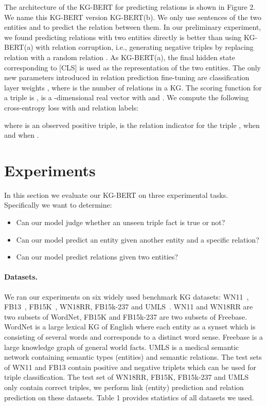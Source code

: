 \documentclass[letterpaper]{article} \usepackage{aaai20}  \usepackage{times}  \usepackage{helvet} \usepackage{courier}  \usepackage[hyphens]{url}  \usepackage{graphicx} \urlstyle{rm} \def\UrlFont{\rm}  \usepackage{graphicx}  \usepackage{amsmath}
\begin{document}
The architecture of the KG-BERT for predicting relations is shown in Figure 2. We name this KG-BERT version KG-BERT(b). We only use sentences of the two entities  and  to predict the relation  between them. In our preliminary experiment, we found predicting relations with two entities directly is better than using KG-BERT(a) with relation corruption, i.e., generating negative triples by replacing relation  with a random relation . As KG-BERT(a), the final hidden state  corresponding to [CLS] is used as the representation of the two entities. The only new parameters introduced in relation prediction fine-tuning are classification layer weights , where  is the number of relations in a KG. The scoring function for a triple  is ,  is a -dimensional real vector with  and . We compute the following cross-entropy loss with  and relation labels:

where  is an observed positive triple,  is the relation indicator for the triple ,  when  and  when .
\section{Experiments}

In this section we evaluate our KG-BERT on three experimental tasks. Specifically we want to determine:
\begin{itemize}
    \item Can our model judge whether an unseen triple fact  is true or not?
    \item Can our model predict an entity given another entity and a specific relation?
    \item Can our model predict relations given two entities?
\end{itemize}


\paragraph{Datasets.}
We ran our experiments on six widely used benchmark KG datasets: WN11~\cite{socher2013reasoning}, FB13~\cite{socher2013reasoning}, FB15K~\cite{bordes2013translating}, WN18RR, FB15k-237 and UMLS~\cite{dettmers2018convolutional}. WN11 and WN18RR are two subsets of WordNet, FB15K and FB15k-237 are two subsets of Freebase. WordNet is a large lexical KG of English where each entity as a synset which is consisting of several words and corresponds to a distinct word sense. Freebase is a large knowledge graph of general world facts. UMLS is a medical semantic network containing semantic types (entities) and semantic relations. The test sets of WN11 and FB13 contain positive and negative triplets which can be used for triple classification. The test set of WN18RR, FB15K, FB15k-237 and UMLS only contain correct triples, we perform link (entity) prediction and relation prediction on these datasets. Table 1 provides statistics of all datasets we used. 
\end{document}
